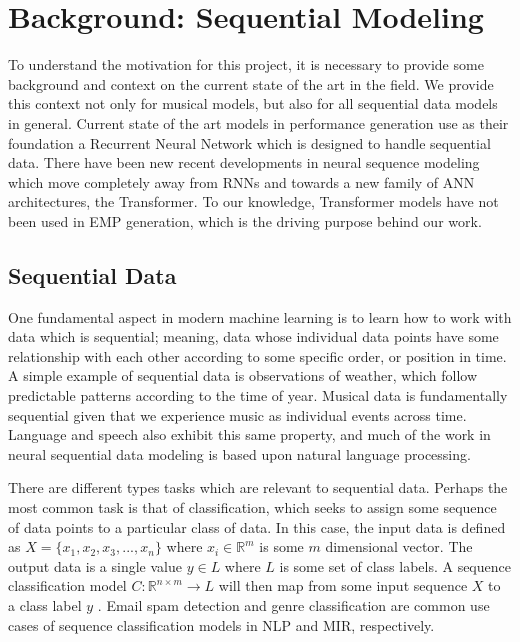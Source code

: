 \chapter{Background: Sequential Modeling}\label{ch:ch3}
To understand the motivation for this project, it is necessary to provide some background and context on the current state of the art in the field. We provide this context not only for musical models, but also for all sequential data models in general. Current state of the art models in performance generation use as their foundation a Recurrent Neural Network which is designed to handle sequential data. There have been new recent developments in neural sequence modeling which move completely away from RNNs and towards a new family of ANN architectures, the Transformer. To our knowledge, Transformer models have not been used in EMP generation, which is the driving purpose behind our work. 

\section{Sequential Data}\label{sec:sequential-data}
One fundamental aspect in modern machine learning is to learn how to work with data which is sequential; meaning, data whose individual data points have some relationship with each other according to some specific order, or position in time. A simple example of sequential data is observations of weather, which follow predictable patterns according to the time of year. Musical data is fundamentally sequential\cite{widmer2016getting} given that we experience music as individual events across time. Language and speech also exhibit this same property, and much of the work in neural sequential data modeling is based upon natural language processing. 

There are different types tasks which are relevant to sequential data. Perhaps the most common task is that of classification, which seeks to assign some sequence of data points to a particular class of data. In this case, the input data is defined as $X = \{x_1, x_2, x_3, ..., x_n\}$ where $x_i \in \mathbb{R}^m$ is some $m$ dimensional vector. The output data is a single value $y \in L$ where $L$ is some set of class labels. A sequence classification model $C: \mathbb{R}^{n \times m} \rightarrow L$ will then map from some input sequence $X$ to a class label $y$ . Email spam detection and genre classification are common use cases of sequence classification models in NLP and MIR, respectively. 

